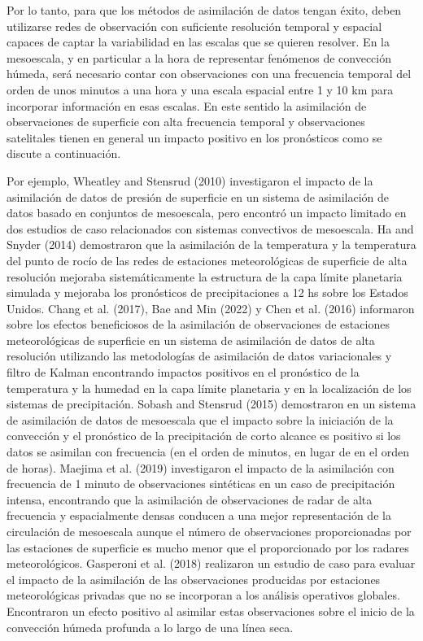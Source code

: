 \documentclass[12pt,oneside,a4paper]{reedthesis}
\begin{document}
Por lo tanto, para que los métodos de asimilación de datos tengan éxito, deben utilizarse redes de observación con suficiente resolución temporal y espacial capaces de captar la variabilidad en las escalas que se quieren resolver. En la mesoescala, y en particular a la hora de representar fenómenos de convección húmeda, será necesario contar con observaciones con una frecuencia temporal del orden de unos minutos a una hora y una escala espacial entre 1 y 10 km para incorporar información en esas escalas. En este sentido la asimilación de observaciones de superficie con alta frecuencia temporal y observaciones satelitales tienen en general un impacto positivo en los pronósticos como se discute a continuación.

Por ejemplo, Wheatley and Stensrud (2010) investigaron el impacto de la asimilación de datos de presión de superficie en un sistema de asimilación de datos basado en conjuntos de mesoescala, pero encontró un impacto limitado en dos estudios de caso relacionados con sistemas convectivos de mesoescala. Ha and Snyder (2014) demostraron que la asimilación de la temperatura y la temperatura del punto de rocío de las redes de estaciones meteorológicas de superficie de alta resolución mejoraba sistemáticamente la estructura de la capa límite planetaria simulada y mejoraba los pronósticos de precipitaciones a 12 hs sobre los Estados Unidos. Chang et al. (2017), Bae and Min (2022) y Chen et al. (2016) informaron sobre los efectos beneficiosos de la asimilación de observaciones de estaciones meteorológicas de superficie en un sistema de asimilación de datos de alta resolución utilizando las metodologías de asimilación de datos variacionales y filtro de Kalman encontrando impactos positivos en el pronóstico de la temperatura y la humedad en la capa límite planetaria y en la localización de los sistemas de precipitación. Sobash and Stensrud (2015) demostraron en un sistema de asimilación de datos de mesoescala que el impacto sobre la iniciación de la convección y el pronóstico de la precipitación de corto alcance es positivo si los datos se asimilan con frecuencia (en el orden de minutos, en lugar de en el orden de horas). Maejima et al. (2019) investigaron el impacto de la asimilación con frecuencia de 1 minuto de observaciones sintéticas en un caso de precipitación intensa, encontrando que la asimilación de observaciones de radar de alta frecuencia y espacialmente densas conducen a una mejor representación de la circulación de mesoescala aunque el número de observaciones proporcionadas por las estaciones de superficie es mucho menor que el proporcionado por los radares meteorológicos. Gasperoni et al. (2018) realizaron un estudio de caso para evaluar el impacto de la asimilación de las observaciones producidas por estaciones meteorológicas privadas que no se incorporan a los análisis operativos globales. Encontraron un efecto positivo al asimilar estas observaciones sobre el inicio de la convección húmeda profunda a lo largo de una línea seca.
\end{document}
